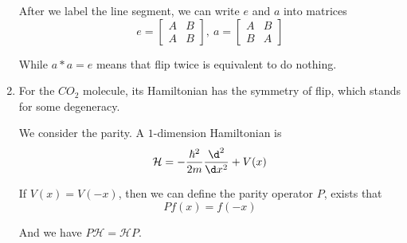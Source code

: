 \begin{example}
\begin{enumerate}
        After we label the line segment, we can write $e$ and $a$ into matrices
        \[e=\begin{bmatrix}A&B\\A&B\end{bmatrix},\ a=\begin{bmatrix}A&B\\B&A\end{bmatrix}\]

        While $a*a=e$ means that flip twice is equivalent to do nothing.
        \item For the $\unit{CO_2}$ molecule, its Hamiltonian has the symmetry of flip, which stands for some degeneracy.
        
        We consider the parity. A $1$-dimension Hamiltonian is
        \[\mathcal H=-\frac{\hbar^2}{2m}\frac{\d^2}{\d x^2}+V(x)\]

        If $V(x)=V(-x)$, then we can define the parity operator $P$, exists that
        \[Pf(x)=f(-x)\]

        And we have $P\mathcal H=\mathcal HP$.
    \end{enumerate}
\end{example}

